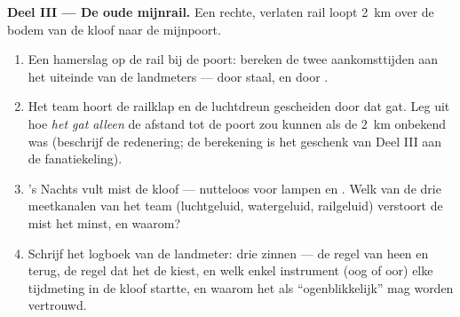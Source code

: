 \begin{problem}
\medskip\noindent\textbf{Deel III --- De oude mijnrail.}
Een rechte, verlaten rail loopt \qty{2}{km} over de bodem van de kloof
naar de mijnpoort.
\begin{enumerate}[resume]
  \item Een hamerslag op de rail bij de poort: bereken de twee
        aankomsttijden aan het uiteinde van de landmeters --- door
        staal, en door .
  \item Het team hoort de railklap en de luchtdreun gescheiden door
        dat gat. Leg uit hoe \emph{het gat alleen} de afstand tot de
        poort zou kunnen  als de \qty{2}{km} onbekend was
        (beschrijf de redenering; de berekening is het geschenk van
        Deel III aan de fanatiekeling).
  \item 's Nachts vult mist de kloof --- nutteloos voor lampen en
        . Welk van de drie meetkanalen van het team
        (luchtgeluid, watergeluid, railgeluid) verstoort de
        mist het minst, en waarom?
  \item Schrijf het logboek van de landmeter: drie zinnen --- de
        regel van heen en terug, de regel dat het  de 
        kiest, en welk enkel instrument (oog of oor) elke tijdmeting
        in de kloof startte, en waarom het als ``ogenblikkelijk'' mag
        worden vertrouwd.
\end{enumerate}
\end{problem}
